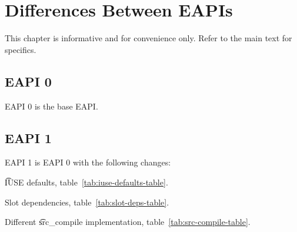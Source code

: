 \chapter{Differences Between EAPIs}

\note This chapter is informative and for convenience only. Refer to the main text for specifics.

\section*{EAPI 0}

EAPI 0 is the base EAPI.

\section*{EAPI 1}

EAPI 1 is EAPI 0 with the following changes:

\begin{compactitem}
\item \t{IUSE} defaults, table~\ref{tab:iuse-defaults-table}.
\item Slot dependencies, table~\ref{tab:slot-deps-table}.
\item Different \t{src\_compile} implementation, table~\ref{tab:src-compile-table}.
\end{compactitem}

